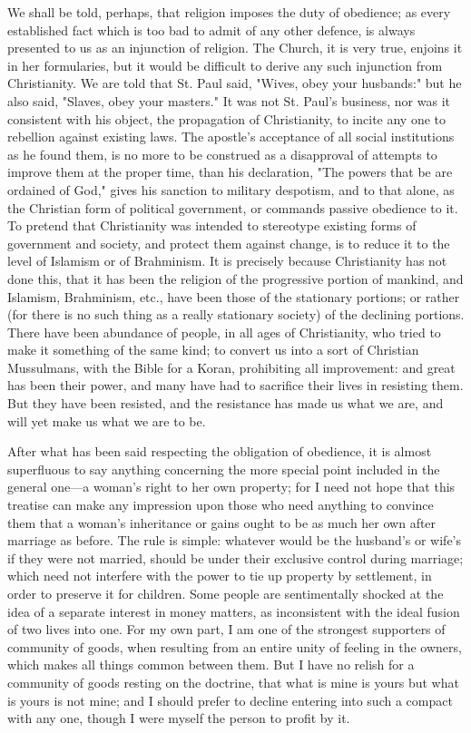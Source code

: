 \documentclass[12pt]{report}
\begin{document}
We shall be told, perhaps, that religion imposes the duty of obedience; as every established fact which is too bad to admit of any other defence, is always presented to us as an injunction of religion. The Church, it is very true, enjoins it in her formularies, but it would be difficult to derive any such injunction from Christianity. We are told that St. Paul said, "Wives, obey your husbands:" but he also said, "Slaves, obey your masters." It was not St. Paul's business, nor was it consistent with his object, the propagation of Christianity, to incite any one to rebellion against existing laws. The apostle's acceptance of all social institutions as he found them, is no more to be construed as a disapproval of attempts to improve them at the proper time, than his declaration, "The powers that be are ordained of God," gives his sanction to military despotism, and to that alone, as the Christian form of political government, or commands passive obedience to it. To pretend that Christianity was intended to stereotype existing forms of government and society, and protect them against change, is to reduce it to the level of Islamism or of Brahminism. It is precisely because Christianity has not done this, that it has been the religion of the progressive portion of mankind, and Islamism, Brahminism, etc., have been those of the stationary portions; or rather (for there is no such thing as a really stationary society) of the declining portions. There have been abundance of people, in all ages of Christianity, who tried to make it something of the same kind; to convert us into a sort of Christian Mussulmans, with the Bible for a Koran, prohibiting all improvement: and great has been their power, and many have had to sacrifice their lives in resisting them. But they have been resisted, and the resistance has made us what we are, and will yet make us what we are to be.

After what has been said respecting the obligation of obedience, it is almost superfluous to say anything concerning the more special point included in the general one—a woman's right to her own property; for I need not hope that this treatise can make any impression upon those who need anything to convince them that a woman's inheritance or gains ought to be as much her own after marriage as before. The rule is simple: whatever would be the husband's or wife's if they were not married, should be under their exclusive control during marriage; which need not interfere with the power to tie up property by settlement, in order to preserve it for children. Some people are sentimentally shocked at the idea of a separate interest in money matters, as inconsistent with the ideal fusion of two lives into one. For my own part, I am one of the strongest supporters of community of goods, when resulting from an entire unity of feeling in the owners, which makes all things common between them. But I have no relish for a community of goods resting on the doctrine, that what is mine is yours but what is yours is not mine; and I should prefer to decline entering into such a compact with any one, though I were myself the person to profit by it.
\end{document}
